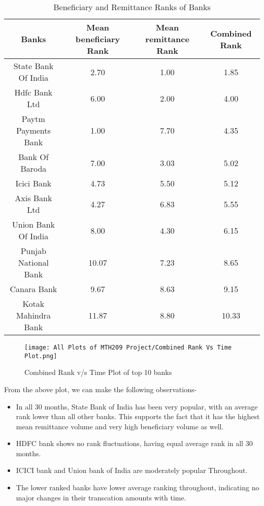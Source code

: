 \documentclass{article}
\begin{document}
\begin{table}[htbp]
  \centering
  \caption{Beneficiary and Remittance Ranks of Banks}
  \label{tab:bank_ranks}
  \begin{tabular}{c|c|c|c|}
    \hline
    \textbf{Banks} & \textbf{Mean beneficiary Rank} & \textbf{Mean remittance Rank} & \textbf{Combined Rank} \\
    \hline
    State Bank Of India     & 2.70   & 1.00  & 1.85 \\
    Hdfc Bank Ltd           & 6.00   & 2.00  & 4.00 \\
    Paytm Payments Bank     & 1.00   & 7.70  & 4.35 \\
    Bank Of Baroda          & 7.00   & 3.03  & 5.02 \\
    Icici Bank              & 4.73   & 5.50  & 5.12 \\
    Axis Bank Ltd           & 4.27   & 6.83  & 5.55 \\
    Union Bank Of India     & 8.00   & 4.30  & 6.15 \\
    Punjab National Bank    & 10.07  & 7.23  & 8.65 \\
    Canara Bank             & 9.67   & 8.63  & 9.15 \\
    Kotak Mahindra Bank     & 11.87  & 8.80  & 10.33 \\
    \hline
  \end{tabular}
\end{table}

\begin{figure}[H]
    \centering
    \texttt{[image: All Plots of MTH209 Project/Combined Rank Vs Time Plot.png]}
    \caption{Combined Rank v/s Time Plot of top 10 banks}
    \label{fig:example}
\end{figure}

From the above plot, we can make the following observations-

\begin{itemize}
    \item In all 30 months, State Bank of India has been very popular, with an average rank lower than all other banks. This supports the fact that it has the highest mean remittance volume and very high beneficiary volume as well. 
    \item HDFC bank shows no rank fluctuations, having equal average rank in all 30 months. 
    \item  ICICI bank and Union bank of India are moderately popular Throughout.
    \item The lower ranked banks have lower average ranking throughout, indicating no major changes in their transcation amounts with time.
    \end{itemize}
\end{document}
